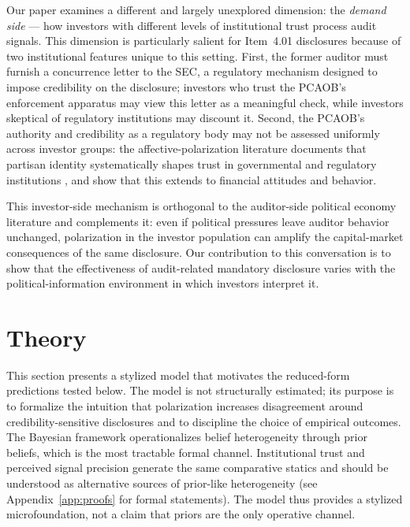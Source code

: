 \documentclass[12pt]{article}
\begin{document}
Our paper examines a different and largely unexplored dimension: the
\emph{demand side} --- how investors with different levels of institutional
trust process audit signals. This dimension is particularly salient for
Item~4.01 disclosures because of two institutional features unique to this
setting. First, the former auditor must furnish a concurrence letter to the
SEC, a regulatory mechanism designed to impose credibility on the
disclosure; investors who trust the PCAOB's enforcement apparatus may view
this letter as a meaningful check, while investors skeptical of regulatory
institutions may discount it. Second, the PCAOB's authority and credibility
as a regulatory body may not be assessed uniformly across investor groups:
the affective-polarization literature documents that partisan identity
systematically shapes trust in governmental and regulatory institutions
\citep{iyengar2012, iyengar2019}, and \citet{kempf2024} show that this
extends to financial attitudes and behavior.

This investor-side mechanism is orthogonal to the auditor-side political
economy literature and complements it: even if political pressures leave
auditor behavior unchanged, polarization in the investor population can
amplify the capital-market consequences of the same disclosure. Our
contribution to this conversation is to show that the effectiveness of
audit-related mandatory disclosure varies with the political-information
environment in which investors interpret it.


\section{Theory}
\label{sec:theory}

This section presents a stylized model that motivates the reduced-form
predictions tested below. The model is not structurally estimated; its
purpose is to formalize the intuition that polarization increases
disagreement around credibility-sensitive disclosures and to discipline
the choice of empirical outcomes. The Bayesian framework operationalizes
belief heterogeneity through prior beliefs, which is the most tractable
formal channel. Institutional trust and perceived signal precision
generate the same comparative statics and should be understood as
alternative sources of prior-like heterogeneity (see
Appendix~\ref{app:proofs} for formal statements). The model thus
provides a stylized microfoundation, not a claim that priors are the
only operative channel.
\end{document}
